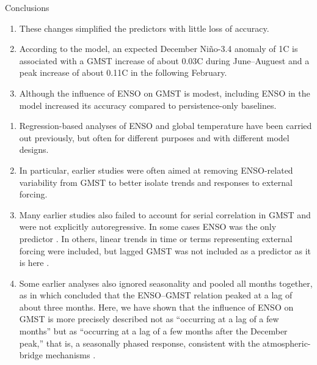 \documentclass[aspectratio=169,xcolor=dvipsnames]{beamer}
\begin{document}
\begin{frame}[allowframebreaks]{Conclusions}
\begin{enumerate}
  \item These changes simplified the predictors with little loss of
    accuracy.
    
  \item According to the model, an expected December Ni\~no-3.4
    anomaly of 1\textdegree C is associated with a GMST increase of
    about 0.03\textdegree C during June--Auguest and a peak increase of
    about 0.11\textdegree C in the following February.

  \item Although the influence of ENSO on GMST is modest, including
    ENSO in the model increased its accuracy compared to
    persistence-only baselines.
  

\end{enumerate}

\begin{enumerate}\fontsize{6pt}{8pt}\selectfont

\item Regression-based analyses of ENSO and global temperature have
  been carried out previously, but often for different purposes and
  with different model designs.

\item In particular, earlier studies were often aimed at removing
  ENSO-related variability from GMST to better isolate trends and
  responses to external forcing.

\item Many earlier studies also failed to account for serial
  correlation in GMST and were not explicitly autoregressive. In some
  cases ENSO was the only predictor
  \citep{Angell2000tropospheric,Trenberth2002evolution}.  In others,
  linear trends in time or terms representing external forcing were
  included, but lagged GMST was not included as a predictor as it is
  here \citep{Foster2011global,Lean2008natural}.

\item Some earlier analyses also ignored seasonality and pooled all
  months together, as in \citet{Trenberth2002evolution} which
  concluded that the ENSO--GMST relation peaked at a lag of about
  three months. Here, we have shown that the influence of ENSO on GMST
  is more precisely described not as ``occurring at a lag of a few
  months'' but as ``occurring at a lag of a few months after the
  December peak,'' that is, a seasonally phased response, consistent
  with the atmospheric-bridge mechanisms
  \citep{Alexander2002atmospheric,Klein1999remote}.


\end{enumerate}
\end{frame}
\end{document}
